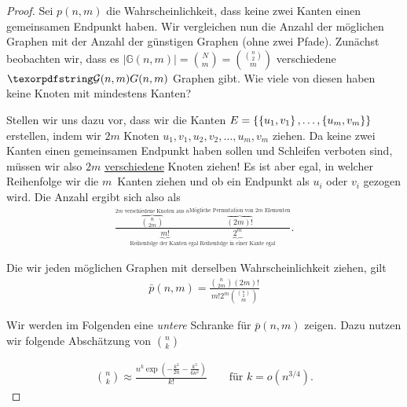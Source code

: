 \begin{proof}
    Sei $p(n,m)$ die Wahrscheinlichkeit, dass keine zwei Kanten einen gemeinsamen Endpunkt haben.
    Wir vergleichen nun die Anzahl der möglichen Graphen mit der Anzahl der günstigen Graphen (\dh ohne zwei Pfade).
    Zunächst beobachten wir, dass es $|\mathbb G(n,m)| = \binom N m = \binom{\binom n 2}{m}$ verschiedene $\Gnm$ Graphen gibt.
    Wie viele von diesen haben keine Knoten mit mindestens Kanten?

    Stellen wir uns dazu vor, dass wir die Kanten $E = \left\{\left\{u_1, v_1\right\}, \ldots, \left\{u_m, v_m\right\}\right\}$ erstellen, indem wir $2m$ Knoten $u_1, v_1, u_2, v_2, \ldots, u_m, v_m$ ziehen.
    Da keine zwei Kanten einen gemeinsamen Endpunkt haben sollen und Schleifen verboten sind, müssen wir also $2m$ \underline{verschiedene} Knoten ziehen!
    Es ist aber egal, in welcher Reihenfolge wir die $m$~Kanten ziehen und ob ein Endpunkt als $u_i$ oder $v_i$ gezogen wird.
    Die Anzahl ergibt sich also als
    \begin{align}
        \frac{
            \overbrace{\binom{n}{2m}}^\text{$2m$ verschiedene Knoten aus $n$}
            \overbrace{(2m)!}^\text{Mögliche Permutation von $2m$ Elementen}
        }{
            \underbrace{m!}_\text{Reihenfolge der Kanten egal\ \ \ }
            \underbrace{2^m}_\text{Reihenfolge in einer Kante egal}
        }.
    \end{align}

    \noindent
    Die wir jeden möglichen Graphen mit derselben Wahrscheinlichkeit ziehen, gilt
    \begin{align}
        \bar p(n, m) = \frac{\binom{n}{2m} (2m)!}{m! 2^m \binom{\binom n 2}{m}} \label{eq:wkeit_keine_zwei_kanten}
    \end{align}

    \noindent
    Wir werden im Folgenden eine \emph{untere} Schranke für $\bar p(n,m)$ zeigen.
    Dazu nutzen wir folgende Abschätzung von $\binom n k$

    \begin{align}
        \binom n k \approx \frac{n^k \exp\left(-\frac{k^2}{2n} - \frac{k^3}{6n^2}\right)}{k!}
        \quad\quad \text{für } k = o(n^{3/4}).
    \end{align}


\end{proof}
